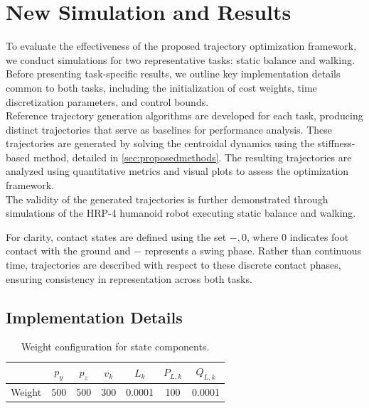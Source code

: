 \documentclass[main.tex]{subfiles}
\begin{document}
\section{New Simulation and Results}
\label{sec:newsimulation}
To evaluate the effectiveness of the proposed trajectory optimization framework, we conduct simulations for two representative tasks: static balance and walking. Before presenting task-specific results, we outline key implementation details common to both tasks, including the initialization of cost weights, time discretization parameters, and control bounds.\\
Reference trajectory generation algorithms are developed for each task, producing distinct trajectories that serve as baselines for performance analysis. These trajectories are generated by solving the centroidal dynamics using the stiffness-based method, detailed in \ref{sec:proposedmethods}. The resulting trajectories are analyzed using quantitative metrics and visual plots to assess the optimization framework.\\ 
The validity of the generated trajectories is further demonstrated through simulations of the HRP-4 humanoid robot executing static balance and walking.\\
\begin{remark}
    For clarity, contact states are defined using the set ${-, 0}$, where $0$ indicates foot contact with the ground and $-$ represents a swing phase. Rather than continuous time, trajectories are described with respect to these discrete contact phases, ensuring consistency in representation across both tasks.
\end{remark}



\subsection{Implementation Details}
\begin{table}[h!]
    \centering
    \begin{tabular}{l|c|c|c|c|c|c}
        \toprule
        & $p_y$ & $p_z$ & $v_k$ & $L_k$ & $P_{L,k}$ & $Q_{L,k}$ \\
        \midrule
        Weight & 500 & 500 & 300 & 0.0001 & 100 & 0.0001 \\
        \bottomrule
    \end{tabular}
    \caption{Weight configuration for state components.}
\end{table}
\end{document}
